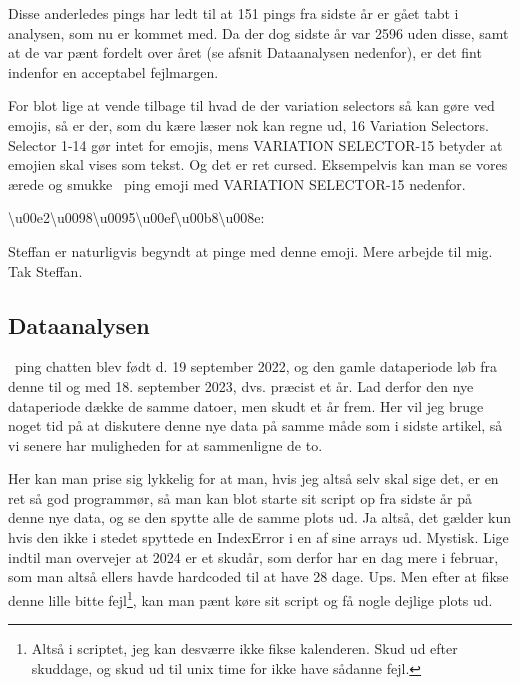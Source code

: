 \begin{article}
Disse anderledes pings har ledt til at 151 pings fra sidste år er gået tabt i analysen, som nu er kommet med. Da der dog sidste år var 2596 uden disse, samt at de var pænt fordelt over året (se afsnit Dataanalysen nedenfor), er det fint indenfor en acceptabel fejlmargen.

For blot lige at vende tilbage til hvad de der variation selectors så kan gøre ved emojis, så er der, som du kære læser nok kan regne ud, 16 Variation Selectors. Selector 1-14 gør intet for emojis, mens VARIATION SELECTOR-15 betyder at emojien skal vises som tekst. Og det er ret cursed. Eksempelvis kan man se vores ærede og smukke \coffee\ ping emoji med VARIATION SELECTOR-15 nedenfor.
\begin{center}
	\textbackslash u00e2\textbackslash u0098\textbackslash u0095\textbackslash u00ef\textbackslash u00b8\textbackslash u008e: \textcoffee
\end{center}
Steffan er naturligvis begyndt at pinge med denne emoji. Mere arbejde til mig. Tak Steffan.


\subsection*{Dataanalysen}

\coffee\ ping chatten blev født d. 19 september 2022, og den gamle dataperiode løb fra denne til og med 18. september 2023, dvs. præcist et år. Lad derfor den nye dataperiode dække de samme datoer, men skudt et år frem.
Her vil jeg bruge noget tid på at diskutere denne nye data på samme måde som i sidste artikel, så vi senere har muligheden for at sammenligne de to.

Her kan man prise sig lykkelig for at man, hvis jeg altså selv skal sige det, er en ret så god programmør, så man kan blot starte sit script op fra sidste år på denne nye data, og se den spytte alle de samme plots ud. Ja altså, det gælder kun hvis den ikke i stedet spyttede en IndexError i en af sine arrays ud. Mystisk. Lige indtil man overvejer at 2024 er et skudår, som derfor har en dag mere i februar, som man altså ellers havde hardcoded til at have 28 dage. Ups.
Men efter at fikse denne lille bitte fejl\footnote{Altså i scriptet, jeg kan desværre ikke fikse kalenderen. Skud ud efter skuddage, og skud ud til unix time for ikke have sådanne fejl.\vspace{2em}}, kan man pænt køre sit script og få nogle dejlige plots ud.


\end{article}
